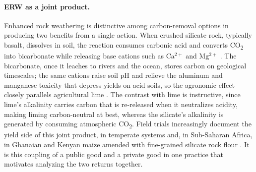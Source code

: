 \documentclass[12pt]{article}
\newcommand{\co}{CO\textsubscript{2}}
\begin{document}
\paragraph{ERW as a joint product.}
Enhanced rock weathering is distinctive among carbon-removal options in producing
two benefits from a single action. When crushed silicate rock, typically basalt,
dissolves in soil, the reaction consumes carbonic acid and converts \co{} into
bicarbonate while releasing base cations such as $\mathrm{Ca^{2+}}$ and
$\mathrm{Mg^{2+}}$ \citep{beerling2020,kantola2017}. The bicarbonate, once it
leaches to rivers and the ocean, stores carbon on geological timescales; the same
cations raise soil pH and relieve the aluminum and manganese toxicity that
depress yields on acid soils, so the agronomic effect closely parallels
agricultural lime \citep{swoboda2022,vanstraaten2002}. The contrast with lime is instructive, since
lime's alkalinity carries carbon that is re-released when it neutralizes acidity,
making liming carbon-neutral at best, whereas the silicate's alkalinity is
generated by consuming atmospheric \co{}. Field trials increasingly document the
yield side of this joint product, in temperate systems
\citep{skov2024,beerling2024pnas} and, in Sub-Saharan Africa, in Ghanaian and
Kenyan maize amended with fine-grained silicate rock flour
\citep{oppongdanso2025,akortey2026,haque2025}. It is this coupling of a public good
and a private good in one practice that motivates analyzing the two returns
together.
\end{document}
